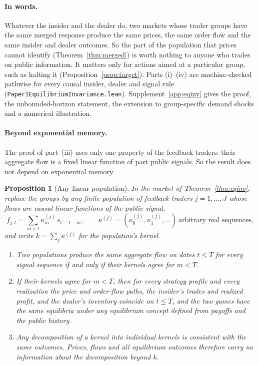 \documentclass[12pt]{article}
\newtheorem{proposition}[theorem]{Proposition}
\theoremstyle{definition}
\theoremstyle{remark}
\begin{document}
\paragraph{In words.} Whatever the insider and the dealer do, two markets whose trader groups have the same merged response produce the same prices, the same order flow and the same insider and dealer outcomes. So the part of the population that prices cannot identify (Theorem~\ref{thm:merged}) is worth nothing to anyone who trades on public information. It matters only for actions aimed at a particular group, such as halting it (Proposition~\ref{prop:target}). Parts (i)--(iv) are machine-checked pathwise for every causal insider, dealer and signal rule (\nolinkurl{Paper1EquilibriumInvariance.lean}). Supplement~\ref{app:eqinv} gives the proof, the unbounded-horizon statement, the extension to group-specific demand shocks and a numerical illustration.

\paragraph{Beyond exponential memory.} The proof of part~(iii) uses only one property of the feedback traders: their aggregate flow is a fixed linear function of past public signals. So the result does not depend on exponential memory.

\begin{proposition}[Any linear population]\label{prop:anylinear}
In the market of Theorem~\ref{thm:eqinv}, replace the groups by any finite population of feedback traders $j=1,\ldots,J$ whose flows are causal linear functions of the public signal,
\[
 f_{j,t}=\sum_{m<t}\kappa^{(j)}_m\,s_{t-1-m},\qquad \kappa^{(j)}=(\kappa^{(j)}_0,\kappa^{(j)}_1,\ldots)\ \text{arbitrary real sequences},
\]
and write $k=\sum_j\kappa^{(j)}$ for the population's kernel.
\begin{enumerate}[label=(\roman*),itemsep=1pt]
\item Two populations produce the same aggregate flow on dates $t\le T$ for every signal sequence if and only if their kernels agree for $m<T$.
\item If their kernels agree for $m<T$, then for every strategy profile and every realization the price and order-flow paths, the insider's trades and realized profit, and the dealer's inventory coincide on $t\le T$, and the two games have the same equilibria under any equilibrium concept defined from payoffs and the public history.
\item Any decomposition of a kernel into individual kernels is consistent with the same outcomes. Prices, flows and all equilibrium outcomes therefore carry no information about the decomposition beyond $k$.
\end{enumerate}
\end{proposition}
\end{document}
